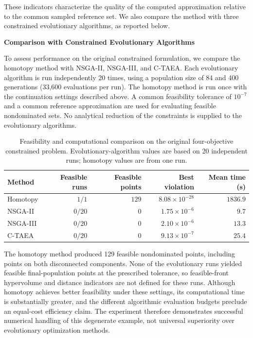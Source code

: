 \documentclass[11pt,pdflatex,sn-mathphys-ay]{sn-jnl}%
\theoremstyle{definition}
\theoremstyle{thmstyleone}%
\theoremstyle{thmstyletwo}%
\theoremstyle{thmstylethree}%
\newcommand{\add}[1]{\textcolor{revisionblue}{#1}}
\begin{document}
	
	\add{These indicators characterize the quality of the computed approximation relative to the common sampled reference set. We also compare the method with three constrained evolutionary algorithms, as reported below.}
	
	
	\medskip \noindent \textbf{Comparison with Constrained Evolutionary Algorithms}
	
	\add{To assess performance on the original constrained formulation, we compare the homotopy method with NSGA-II, NSGA-III, and C-TAEA. Each evolutionary algorithm is run independently 20 times, using a population size of 84 and 400 generations (33,600 evaluations per run). The homotopy method is run once with the continuation settings described above. A common feasibility tolerance of $10^{-7}$ and a common reference approximation are used for evaluating feasible nondominated sets. No analytical reduction of the constraints is supplied to the evolutionary algorithms.}
	
	\begin{table}[h]
		\centering
		\caption{Feasibility and computational comparison on the original four-objective constrained problem. Evolutionary-algorithm values are based on 20 independent runs; homotopy values are from one run.}
		\label{tab:manyobj_algorithm_comparison}
		\renewcommand{\arraystretch}{1.1}
		\begin{tabular}{lrrrr}
			\toprule
			Method & Feasible runs & Feasible points & Best violation & Mean time (s) \\
			\midrule
			Homotopy & $1/1$ & $129$ & $8.08\times10^{-28}$ & $1836.9$ \\
			NSGA-II & $0/20$ & $0$ & $1.75\times10^{-6}$ & $9.7$ \\
			NSGA-III & $0/20$ & $0$ & $2.10\times10^{-6}$ & $13.3$ \\
			C-TAEA & $0/20$ & $0$ & $9.13\times10^{-7}$ & $25.4$ \\
			\bottomrule
		\end{tabular}
	\end{table}
	
	\add{The homotopy method produced 129 feasible nondominated points, including points on both disconnected components. None of the evolutionary runs yielded feasible final-population points at the prescribed tolerance, so feasible-front hypervolume and distance indicators are not defined for these runs. Although homotopy achieves better feasibility under these settings, its computational time is substantially greater, and the different algorithmic evaluation budgets preclude an equal-cost efficiency claim. The experiment therefore demonstrates successful numerical handling of this degenerate example, not universal superiority over evolutionary optimization methods.}
	
\end{document}
